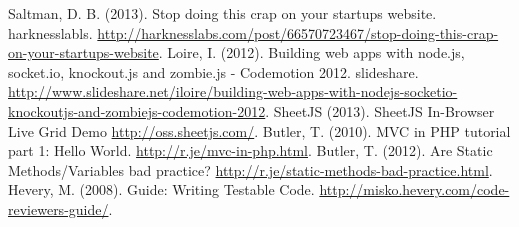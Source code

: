 \begin{thebibliography}{9}
 Saltman, D. B. (2013). Stop doing this crap on your
startups website. harknesslabls.
\url{http://harknesslabs.com/post/66570723467/stop-doing-this-crap-on-your-startups-website}.
 Loire, I. (2012). Building web apps with node.js, socket.io,
knockout.js and zombie.js - Codemotion 2012. slideshare.
\url{http://www.slideshare.net/iloire/building-web-apps-with-nodejs-socketio-knockoutjs-and-zombiejs-codemotion-2012}.
 SheetJS (2013). SheetJS In-Browser Live Grid Demo
\url{http://oss.sheetjs.com/}.
 Butler, T. (2010). MVC in PHP tutorial part 1: Hello
World. \url{http://r.je/mvc-in-php.html}.
 Butler, T. (2012). Are Static Methods/Variables bad
practice? \url{http://r.je/static-methods-bad-practice.html}.
 Hevery, M. (2008). Guide: Writing Testable
Code. \url{http://misko.hevery.com/code-reviewers-guide/}.
\end{thebibliography}
